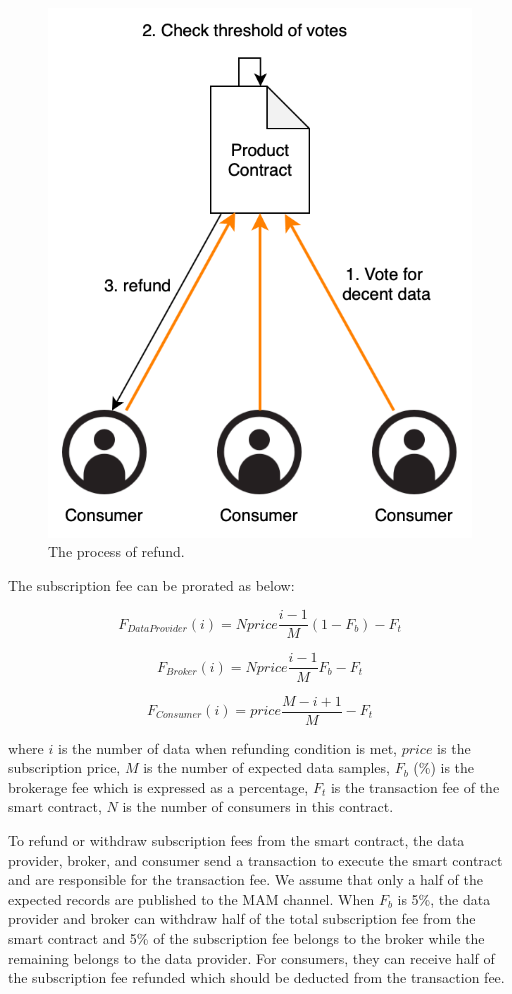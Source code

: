 \documentclass[journal,article,applsci,submit,moreauthors,pdftex]{Definitions/mdpi}
\begin{document}
\begin{figure}[h]
	\centering
	\includegraphics[width=2 in]{refund}
	\caption{The process of refund.}
	\label{fig:refund}
\end{figure}

The subscription fee can be prorated as below:

\begin{equation}
    F_{DataProvider}(i) = N price \frac{i-1}{M} (1-F_{b}) -F_{t}
\end{equation}

\begin{equation}
    F_{Broker}(i) = N price \frac{i-1}{M} F_{b} -F_{t}
\end{equation}

\begin{equation}
    F_{Consumer}(i) = price \frac{M-i+1}{M} -F_{t}
\end{equation}

where $i$ is the number of data when refunding condition is met, $price$  is the subscription price, $M$ is the number of expected data samples, $F_{b}$ (\%) is the brokerage fee which is expressed as a percentage, $F_{t}$ is the transaction fee of the smart contract, $N$ is the number of consumers in this contract.

To refund or withdraw subscription fees from the smart contract, the data provider, broker, and consumer send a transaction to execute the smart contract and are responsible for the transaction fee. We assume that only a half of the expected records are published to the MAM channel. When $F_{b}$ is 5\%, the data provider and broker can withdraw half of the total subscription fee from the smart contract and 5\% of the subscription fee belongs to the broker while the remaining belongs to the data provider. For consumers, they can receive half of the subscription fee refunded which should be deducted from the transaction fee.
\end{document}
